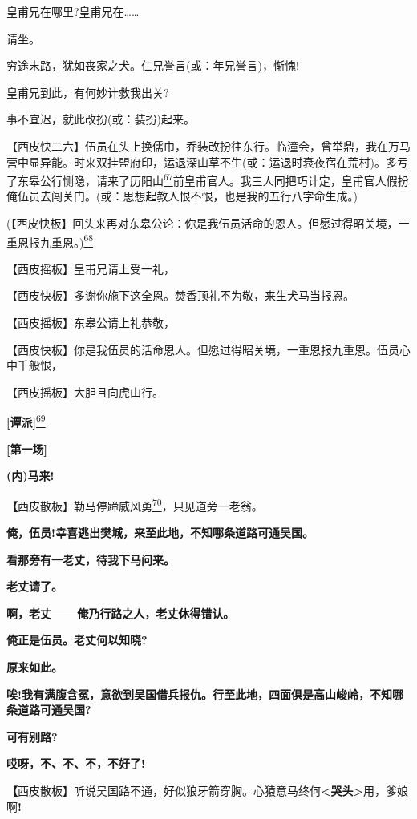 皇甫兄在哪里?皇甫兄在\ldots{}\ldots{}

请坐。

穷途末路，犹如丧家之犬。仁兄誉言(或：年兄誉言)，惭愧!

皇甫兄到此，有何妙计救我出关?

事不宜迟，就此改扮(或：装扮)起来。

【西皮快二六】伍员在头上换儒巾，乔装改扮往东行。临潼会，曾举鼎，我在万马营中显异能。时来双挂盟府印，运退深山草不生(或：运退时衰夜宿在荒村)。多亏了东皋公行恻隐，请来了历阳山\protect\hyperlink{fn67}{\textsuperscript{67}}前皇甫官人。我三人同把巧计定，皇甫官人假扮俺伍员去闯关门。(或：思想起教人恨不恨，也是我的五行八字命生成。)

(【西皮快板】回头来再对东皋公论：你是我伍员活命的恩人。但愿过得昭关境，一重恩报九重恩。)\protect\hyperlink{fn68}{\textsuperscript{68}}

【西皮摇板】皇甫兄请上受一礼，

【西皮快板】多谢你施下这全恩。焚香顶礼不为敬，来生犬马当报恩。

【西皮摇板】东皋公请上礼恭敬，

【西皮快板】你是我伍员的活命恩人。但愿过得昭关境，一重恩报九重恩。伍员心中千般恨，

【西皮摇板】大胆且向虎山行。

\textbf{{[}谭派{]}}\protect\hyperlink{fn69}{\textsuperscript{69}}

\textbf{{[}第一场{]}}

\textbf{(内)马来!}

\textbf{【}西皮散板】勒马停蹄威风勇\protect\hyperlink{fn70}{\textsuperscript{70}}，只见道旁一老翁。

\textbf{俺，伍员!幸喜逃出樊城，来至此地，不知哪条道路可通吴国。}

\textbf{看那旁有一老丈，待我下马问来。}

\textbf{老丈请了。}

\textbf{啊，老丈------俺乃行路之人，老丈休得错认。}

\textbf{俺正是伍员。老丈何以知晓?}

\textbf{原来如此。}

\textbf{唉!我有满腹含冤，意欲到吴国借兵报仇。行至此地，四面俱是高山峻岭，不知哪条道路可通吴国?}

\textbf{可有别路?}

\textbf{哎呀，不、不、不，不好了!}

\textbf{【}西皮散板】听说吴国路不通，好似狼牙箭穿胸。心猿意马终何\textbf{\textless{}哭头\textgreater{}}用，爹娘啊\textbf{!}

